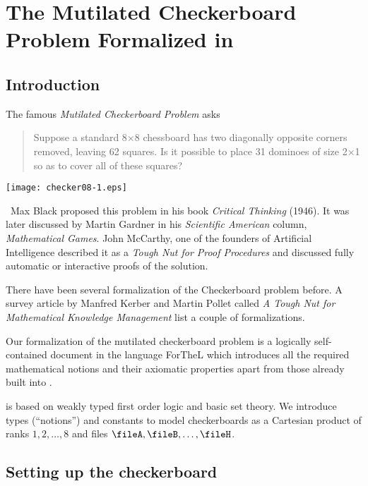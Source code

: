 \section{The Mutilated Checkerboard Problem Formalized in \Naproche{}}\label{sec:formalization}



\subsection{Introduction}

The famous {\emph{Mutilated Checkerboard Problem}} asks

\begin{quotation}
  Suppose a standard 8$\times$8 chessboard has two diagonally opposite corners
  removed, leaving 62 squares. Is it possible to place 31 dominoes of size
  2$\times$1 so as to cover all of these squares?
\end{quotation}

\begin{center}
  {\texttt{[image: checker08-1.eps]}}
\end{center}

\
Max Black proposed this problem in his book
\textit{Critical Thinking} (1946).
%
It was later discussed by Martin Gardner in his
\textit{Scientific American} column, \textit{Mathematical Games}.
%
John McCarthy, one of the
founders of Artificial Intelligence described it as a
\textit{Tough Nut for Proof Procedures}
and discussed fully automatic or interactive proofs of the solution.

There have been several formalization of the Checkerboard problem before. A
survey article by Manfred Kerber and Martin Pollet called {\emph{A Tough Nut
for Mathematical Knowledge Management}} list a couple of formalizations.

Our formalization of the mutilated checkerboard problem is a logically
self-contained document in the language ForTheL which introduces all the
required mathematical notions and their axiomatic properties apart from those
already built into \Naproche{}.

\Naproche{} is based on weakly typed first order logic and basic set
theory. We introduce types (``notions'') and constants to model checkerboards
as a Cartesian product of ranks $1, 2, \ldots, 8$ and files $\fileA, \fileB, \ldots, \fileH$.



\subsection{Setting up the checkerboard}

